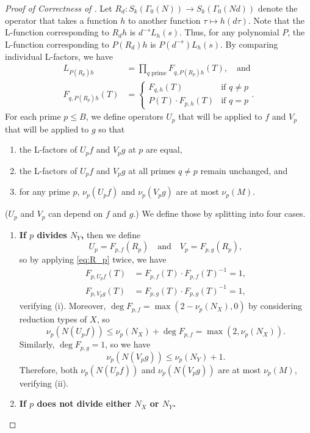 \documentclass{amsproc}
\numberwithin{equation}{section}
\theoremstyle{definition}
\theoremstyle{remark}
\begin{document}
\begin{proof}[Proof of Correctness of ]
    Let $R_d : S_k(\Gamma_0(N)) \to S_k(\Gamma_0(Nd))$ denote the operator that takes a function $h$ to another function $\tau\mapsto h(d\tau)$. Note that the L-function corresponding to $R_dh$ is $d^{-s} L_h(s)$. 
    Thus, for any polynomial $P$, the L-function corresponding to $P(R_d)h$ is $P(d^{-s}) L_h(s)$.
    By comparing individual L-factors, we have
    \begin{align}
        L_{P(R_p)h} &= \prod_{q\text{ prime}} F_{q,P(R_p)h}(T),\quad \text{and} \\
        \label{eq:R_p}
        F_{q, P(R_p) h}(T)  &=
        \begin{cases}
            F_{q,h}(T) & \text{if }q\neq p \\
            P(T)\cdot F_{p,h}(T) & \text{if }q=p
        \end{cases}.
    \end{align}
    For each prime $p\leq B$, we define operators $U_p$
    that will be applied to $f$ and $V_p$ that will be applied to $g$ so that 
    \begin{enumerate}[label=(\roman*)]
    \item the L-factors of $U_pf$ and $V_pg$ at $p$ are equal,
    \item the L-factors of $U_pf$ and $V_pg$ at all primes 
    $q\neq p$ remain unchanged, and
    \item for any prime $p$, $\nu_p(U_pf)$ and $\nu_p(V_pg)$ are at most $\nu_p(M)$.
    \end{enumerate}
    ($U_p$ and $V_p$ can depend on $f$ and $g$.)
    We define those by splitting into four cases.
    \begin{enumerate}
    \item \textbf{If $p$ divides $N_Y$,}
    then we define
    $$U_p = F_{p,f}(R_p)\quad\text{and}\quad V_p = F_{p,g}(R_p),$$
    so by applying \eqref{eq:R_p} twice, we have 
    \begin{align*}
    F_{p, U_pf}(T) &= F_{p,f}(T)\cdot F_{p,f}(T)^{-1} = 1, \\
    F_{p,V_pg}(T)
    &=F_{p,g}(T)\cdot F_{p,g}(T)^{-1} =1,
    \end{align*}
    verifying (i).
    Moreover, $\deg F_{p,f} = \max(2-\nu_p(N_X), 0)$ by considering reduction types of $X$,
    so 
    $$\nu_p(N(U_pf)) \leq \nu_p(N_X) + \deg F_{p,f} = \max(2, \nu_p(N_X)).$$
    Similarly, $\deg F_{p,g} = 1$, so we have
    $$\nu_p(N(V_pg)) \leq \nu_p(N_Y)+1.$$
    Therefore, both $\nu_p(N(U_pf))$ and $\nu_p(N(V_pg))$
    are at most $\nu_p(M)$, verifying (ii).
    \item \textbf{If $p$ does not divide either $N_X$ or $N_Y$.} 

\end{enumerate}
\end{proof}
\end{document}
